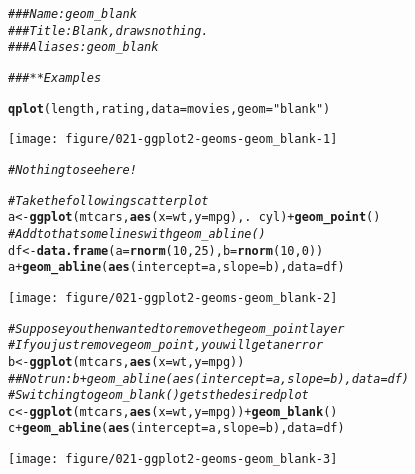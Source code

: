 \documentclass[a4paper,titlepage]{tufte-handout}\usepackage[]{graphicx}\usepackage[]{color}
\makeatletter
\def\maxwidth{ %
  \ifdim\Gin@nat@width>\linewidth
    \linewidth
  \else
    \Gin@nat@width
  \fi
}
\newcommand{\hlnum}[1]{\textcolor[rgb]{0.686,0.059,0.569}{#1}}%
\newcommand{\hlstr}[1]{\textcolor[rgb]{0.192,0.494,0.8}{#1}}%
\newcommand{\hlcom}[1]{\textcolor[rgb]{0.678,0.584,0.686}{\textit{#1}}}%
\newcommand{\hlopt}[1]{\textcolor[rgb]{0,0,0}{#1}}%
\newcommand{\hlstd}[1]{\textcolor[rgb]{0.345,0.345,0.345}{#1}}%
\newcommand{\hlkwb}[1]{\textcolor[rgb]{0.69,0.353,0.396}{#1}}%
\newcommand{\hlkwc}[1]{\textcolor[rgb]{0.333,0.667,0.333}{#1}}%
\newcommand{\hlkwd}[1]{\textcolor[rgb]{0.737,0.353,0.396}{\textbf{#1}}}%
\newenvironment{kframe}{%
 \def\at@end@of@kframe{}%
 \ifinner\ifhmode%
  \def\at@end@of@kframe{\end{minipage}}%
  \begin{minipage}{\columnwidth}%
 \fi\fi%
 \def\FrameCommand##1{\hskip\@totalleftmargin \hskip-\fboxsep
 \colorbox{shadecolor}{##1}\hskip-\fboxsep
     \hskip-\linewidth \hskip-\@totalleftmargin \hskip\columnwidth}%
 \MakeFramed {\advance\hsize-\width
   \@totalleftmargin\z@ \linewidth\hsize
   \@setminipage}}%
 {\par\unskip\endMakeFramed%
 \at@end@of@kframe}
\newenvironment{knitrout}{}{} %
\makeatother
\begin{document}
\begin{knitrout}
\color{fgcolor}\begin{kframe}
\begin{alltt}
\hlcom{### Name: geom_blank}
\hlcom{### Title: Blank, draws nothing.}
\hlcom{### Aliases: geom_blank}

\hlcom{### ** Examples}

\hlkwd{qplot}\hlstd{(length, rating,} \hlkwc{data} \hlstd{= movies,} \hlkwc{geom} \hlstd{=} \hlstr{"blank"}\hlstd{)}
\end{alltt}
\end{kframe}
\texttt{[image: figure/021-ggplot2-geoms-geom\_blank-1]} 
\begin{kframe}\begin{alltt}
\hlcom{# Nothing to see here!}

\hlcom{# Take the following scatter plot}
\hlstd{a} \hlkwb{<-} \hlkwd{ggplot}\hlstd{(mtcars,} \hlkwd{aes}\hlstd{(}\hlkwc{x} \hlstd{= wt,} \hlkwc{y} \hlstd{= mpg), .} \hlopt{~} \hlstd{cyl)} \hlopt{+} \hlkwd{geom_point}\hlstd{()}
\hlcom{# Add to that some lines with geom_abline()}
\hlstd{df} \hlkwb{<-} \hlkwd{data.frame}\hlstd{(}\hlkwc{a} \hlstd{=} \hlkwd{rnorm}\hlstd{(}\hlnum{10}\hlstd{,} \hlnum{25}\hlstd{),} \hlkwc{b} \hlstd{=} \hlkwd{rnorm}\hlstd{(}\hlnum{10}\hlstd{,} \hlnum{0}\hlstd{))}
\hlstd{a} \hlopt{+} \hlkwd{geom_abline}\hlstd{(}\hlkwd{aes}\hlstd{(}\hlkwc{intercept} \hlstd{= a,} \hlkwc{slope} \hlstd{= b),} \hlkwc{data} \hlstd{= df)}
\end{alltt}
\end{kframe}
\texttt{[image: figure/021-ggplot2-geoms-geom\_blank-2]} 
\begin{kframe}\begin{alltt}
\hlcom{# Suppose you then wanted to remove the geom_point layer}
\hlcom{# If you just remove geom_point, you will get an error}
\hlstd{b} \hlkwb{<-} \hlkwd{ggplot}\hlstd{(mtcars,} \hlkwd{aes}\hlstd{(}\hlkwc{x} \hlstd{= wt,} \hlkwc{y} \hlstd{= mpg))}
\hlcom{## Not run: b + geom_abline(aes(intercept = a, slope = b), data = df)}
\hlcom{# Switching to geom_blank() gets the desired plot}
\hlstd{c} \hlkwb{<-} \hlkwd{ggplot}\hlstd{(mtcars,} \hlkwd{aes}\hlstd{(}\hlkwc{x} \hlstd{= wt,} \hlkwc{y} \hlstd{= mpg))} \hlopt{+} \hlkwd{geom_blank}\hlstd{()}
\hlstd{c} \hlopt{+} \hlkwd{geom_abline}\hlstd{(}\hlkwd{aes}\hlstd{(}\hlkwc{intercept} \hlstd{= a,} \hlkwc{slope} \hlstd{= b),} \hlkwc{data} \hlstd{= df)}
\end{alltt}
\end{kframe}
\texttt{[image: figure/021-ggplot2-geoms-geom\_blank-3]} 

\end{knitrout}
\end{document}
